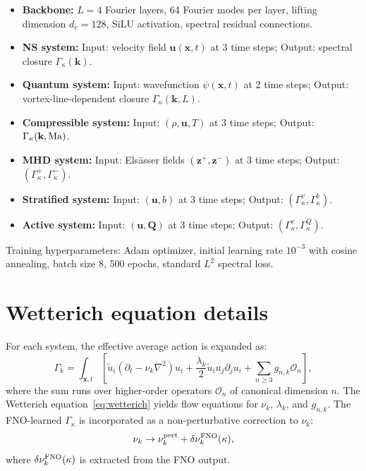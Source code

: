 \begin{itemize}
\item \textbf{Backbone:} $L=4$ Fourier layers, 64 Fourier modes per layer, lifting dimension $d_v=128$, SiLU activation, spectral residual connections.
\item \textbf{NS system:} Input: velocity field $\mathbf{u}(\mathbf{x},t)$ at 3 time steps; Output: spectral closure $\Gamma_\kappa(\mathbf{k})$.
\item \textbf{Quantum system:} Input: wavefunction $\psi(\mathbf{x},t)$ at 2 time steps; Output: vortex-line-dependent closure $\Gamma_\kappa(\mathbf{k},L)$.
\item \textbf{Compressible system:} Input: $(\rho, \mathbf{u}, T)$ at 3 time steps; Output: $\Gamma_\kappa(\mathbf{k},\mathrm{Ma})$.
\item \textbf{MHD system:} Input: Els\"asser fields $(\mathbf{z}^+,\mathbf{z}^-)$ at 3 time steps; Output: $(\Gamma_\kappa^+,\Gamma_\kappa^-)$.
\item \textbf{Stratified system:} Input: $(\mathbf{u}, b)$ at 3 time steps; Output: $(\Gamma_\kappa^v, \Gamma_\kappa^b)$.
\item \textbf{Active system:} Input: $(\mathbf{u}, \mathbf{Q})$ at 3 time steps; Output: $(\Gamma_\kappa^v, \Gamma_\kappa^Q)$.
\end{itemize}

Training hyperparameters: Adam optimizer, initial learning rate $10^{-3}$ with cosine annealing, batch size 8, 500 epochs, standard $L^2$ spectral loss.

\section{Wetterich equation details\label{app:wetterich}}

For each system, the effective average action is expanded as:
{\footnotesize
\begin{equation}
 \Gamma_k = \int_{\mathbf{x},t}\left[\tilde{u}_i(\partial_t - \nu_k\nabla^2)u_i + \frac{\lambda_k}{2}\tilde{u}_i u_j\partial_j u_i + \sum_{n\geq 3} g_{n,k}\mathcal{O}_n\right],
\end{equation}
}
where the sum runs over higher-order operators $\mathcal{O}_n$ of canonical dimension $n$. The Wetterich equation~\eqref{eq:wetterich} yields flow equations for $\nu_k$, $\lambda_k$, and $g_{n,k}$. The FNO-learned $\Gamma_\kappa$ is incorporated as a non-perturbative correction to $\nu_k$:
\begin{equation}
\nu_k \to \nu_k^{\mathrm{pert}} + \delta\nu_k^{\text{FNO}}(\kappa),
\end{equation}
where $\delta\nu_k^{\text{FNO}}(\kappa)$ is extracted from the FNO output.

